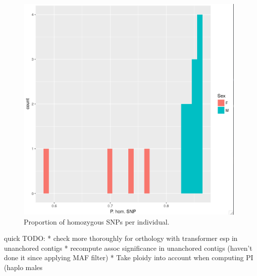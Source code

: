 \documentclass[10pt,a4paper]{report}
\begin{document}
\begin{figure}
\includegraphics[width=\textwidth]{nucleo_div_wgs/PI/hom_WGS.png}
\caption{Proportion of homozygous SNPs per individual.}
\label{heat_var_QC}
\end{figure}


quick TODO:
* check more thoroughly for orthology with transformer esp in unanchored contigs
* recompute assoc significance in unanchored contigs (haven't done it since applying MAF filter)
* Take ploidy into account when computing PI (haplo males
\end{document}
